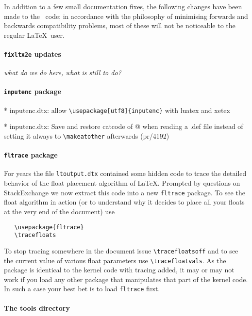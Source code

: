 \documentclass{ltnews}
\begin{document}
In addition to a few small documentation fixes, the following changes
have been made to the \LaTeXe\ code; in accordance with the philosophy
of minimising forwards and backwards compatibility problems, most of
these will not be noticeable to the regular \LaTeX\ user.

\paragraph{\texttt{fixltx2e} updates}

\textit{what do we do here, what is still to do?}

\paragraph{\texttt{inputenc} package}


\begin{itshape}
	* inputenc.dtx: allow \verb=\usepackage[utf8]{inputenc}= with luatex and xetex

	* inputenc.dtx: Save and restore catcode of @ when reading a .def file
	instead of setting it always to \verb=\makeatother= afterwards (pr/4192)

\end{itshape}

\paragraph{\texttt{fltrace} package}

For years the file \texttt{ltoutput.dtx} contained some hidden code to
trace the detailed behavior of the float placement algorithm of
\LaTeX. Prompted by questions on StackExchange we now extract this
code into a new \texttt{fltrace} package. To see the float algorithm
in action (or to understand why it decides to place all your floats at
the very end of the document) use
\begin{verbatim}
   \usepackage{fltrace}
   \tracefloats
\end{verbatim}
To stop tracing somewhere in the document issue
\verb=\tracefloatsoff= and to see the current value of various float
parameters use \verb=\tracefloatvals=. As the package is identical to
the kernel code with tracing added, it may or may not work if you load any
other package that manipulates that part of the kernel code. In such a
case your best bet is to load \texttt{fltrace} first.


\paragraph{The tools directory}
\end{document}
